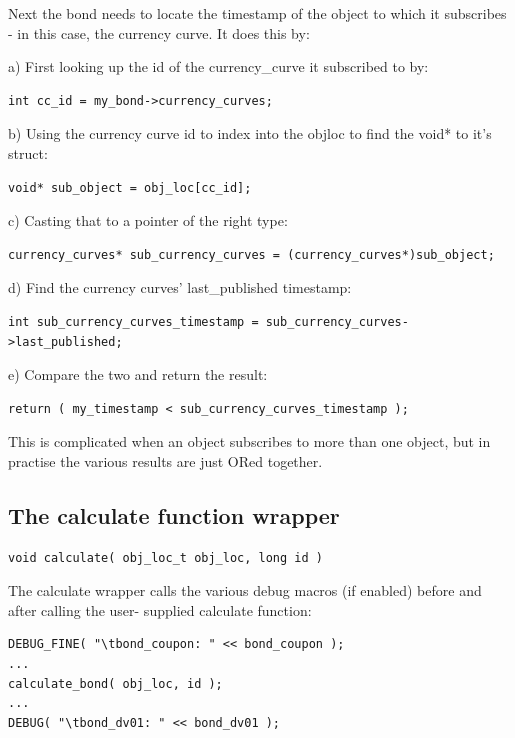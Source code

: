 \documentclass{report}
\begin{document}
Next the bond needs to locate the timestamp of the object to which it subscribes - in this case, the 
currency curve. It does this by:

a) First looking up the id of the currency_curve it subscribed to by:
\begin{verbatim}
int cc_id = my_bond->currency_curves;
\end{verbatim}

b) Using the currency curve id to index into the objloc to find the void* to it's struct:
\begin{verbatim}
void* sub_object = obj_loc[cc_id];
\end{verbatim}

c) Casting that to a pointer of the right type:
\begin{verbatim}
currency_curves* sub_currency_curves = (currency_curves*)sub_object;
\end{verbatim}

d) Find the currency curves' last_published timestamp:
    
\begin{verbatim}
int sub_currency_curves_timestamp = sub_currency_curves->last_published;
\end{verbatim}

e) Compare the two and return the result:
\begin{verbatim}
return ( my_timestamp < sub_currency_curves_timestamp );
\end{verbatim}

This is complicated when an object subscribes to more than one object, but in practise the various results are just ORed together. 

\subsection{The calculate function wrapper}

\begin{verbatim}
void calculate( obj_loc_t obj_loc, long id )
\end{verbatim}

The calculate wrapper calls the various debug macros (if enabled) before and after calling the user-
supplied calculate function:

\begin{verbatim}
DEBUG_FINE( "\tbond_coupon: " << bond_coupon );
...
calculate_bond( obj_loc, id );
...
DEBUG( "\tbond_dv01: " << bond_dv01 );
\end{verbatim}
\end{document}

